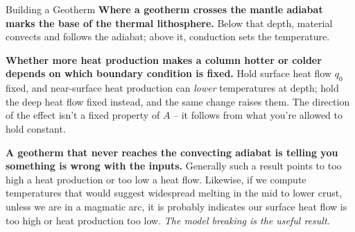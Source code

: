 \begin{activity}{Building a Geotherm}
\textbf{Where a geotherm crosses the mantle adiabat marks the base of the thermal lithosphere.} Below that depth, material convects and follows the adiabat; above it, conduction sets the temperature.

\textbf{Whether more heat production makes a column hotter or colder depends on which boundary condition is fixed.} Hold surface heat flow $q_0$ fixed, and near-surface heat production can \emph{lower} temperatures at depth; hold the deep heat flow fixed instead, and the same change raises them. The direction of the effect isn't a fixed property of $A$ -- it follows from what you're allowed to hold constant.

\textbf{A geotherm that never reaches the convecting adiabat is telling you something is wrong with the inputs.} Generally such a result points to too high a heat production or too low a heat flow.  Likewise, if we compute temperatures that would suggest widespread melting in the mid to lower crust, unless we are in a magmatic arc, it is probably indicates our surface heat flow is too high or heat production too low. \emph{The model breaking is the useful result.} 

\end{activity}
